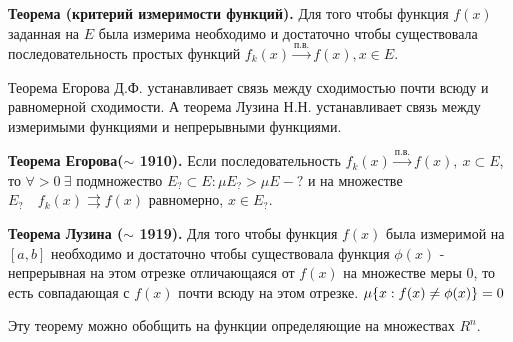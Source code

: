 \documentclass[12pt]{report}
\renewcommand{\[}{$\\\displaystyle}
\renewcommand{\]}{\\$}
\renewcommand{\[}{$\\\displaystyle}
\newcommand{\sep}{,\ }
\newcommand{\tth}[1][]{\textbf{Теорема#1.}}
\begin{document}
\tth[ (критерий измеримости функций)] Для того чтобы функция $f(x)$ заданная на $E$ была измерима необходимо и достаточно чтобы существовала последовательность простых функций $f_k (x) \xrightarrow{\text{п.в.}} f(x), x \in E$.

Теорема Егорова Д.Ф. устанавливает связь между сходимостью почти всюду и равномерной сходимости. А теорема Лузина Н.Н. устанавливает связь между измеримыми функциями и непрерывными функциями.

\tth[ Егорова($\sim$ 1910)] Если последовательность $f_k(x) \xrightarrow{п.в.} f(x) \sep x \subset E$, то $\forall  > 0 \ \exists$ подмножество $ E_? \subset E : \mu E_? > \mu E - ? $ и на множестве $E_? \quad f_k(x) \rightrightarrows f(x)$ равномерно, $x \in E_?$.

\tth[ Лузина ($\sim$ 1919)] Для того чтобы функция $f(x)$ была измеримой на $[a,b]$ необходимо и достаточно чтобы существовала функция $\phi(x)$ - непрерывная на этом отрезке отличающаяся от $f(x)$ на множестве меры 0, то есть совпадающая с $f(x)$ почти всюду на этом отрезке.
\[\mu\{x:f(x) \neq \phi (x)\} = 0\]

Эту теорему можно обобщить на функции определяющие на множествах $R^n$.

\end{document}

